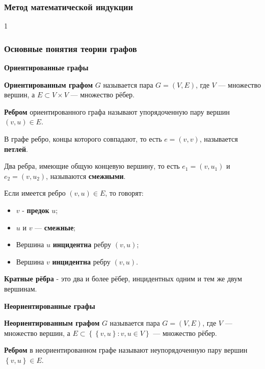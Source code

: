 \documentclass[12pt]{matmex-diploma}
\begin{document}
        \subsubsection*{Метод математической индукции}
            1
        \subsubsection*{Основные понятия теории графов}
        
            \textbf{Ориентированные графы}
            
            \textbf{Ориентированным графом} $G$ называется пара $G = (V, E)$, где $V$ — множество вершин, а $E \subset V \times V$ — множество рёбер.
            
            \textbf{Ребром} ориентированного графа называют упорядоченную пару вершин $(v, u) \in E$.
            
            В графе ребро, концы которого совпадают, то есть $e = (v,v)$, называется \textbf{петлей}.
            
            Два ребра, имеющие общую концевую вершину, то есть $e_1 = (v,u_1)$ и $e_2 = (v,u_2)$, называются \textbf{смежными}.
            
            Если имеется ребро $(v, u) \in E$, то говорят:
            \begin{itemize}
                \item $v$ - \textbf{предок} $u$;
                \item $u$ и $v$ — \textbf{смежные};
                \item Вершина $u$ \textbf{инцидентна} ребру $(v, u)$;
                \item Вершина $v$ \textbf{инцидентна} ребру $(v, u)$.
            \end{itemize} 
            
            \textbf{Кратные рёбра} - это два и более рёбер, инцидентных одним и тем же двум вершинам.
            
            \textbf{Неориентированные графы}
            
            \textbf{Неориентированным графом} $G$ называется пара $G = (V, E)$, где $V$ — множество вершин, а $E \subset \left\{ {\left\{ v, u \right\}} : v,u \in V \right\}$ — множество рёбер.
            
            \textbf{Ребром} в неориентированном графе называют неупорядоченную пару вершин ${\left\{ v, u \right\}} \in E$.
            
\end{document}
